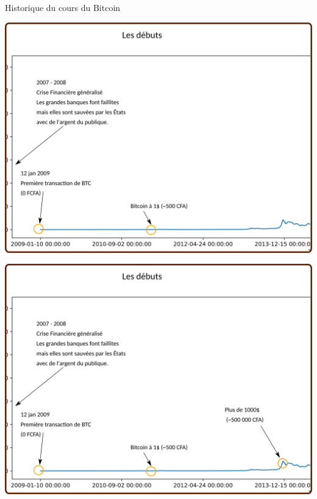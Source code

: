 \documentclass[presentation]{beamer}
\begin{document}
\begin{frame}[label={sec:org6ff9387}]{Historique du cours du Bitcoin}
\begin{block}{}
\begin{center}
\includegraphics[width=.95\textwidth]{./Pictures/Timeline/02debut_prix_1.png}
\end{center}
\end{block}
\begin{block}{}
\begin{center}
\includegraphics[width=.95\textwidth]{./Pictures/Timeline/03debut_prix_1000.png}
\end{center}
\end{block}
\begin{block}{}
\begin{center}

\end{center}
\end{block}
\end{frame}
\end{document}
